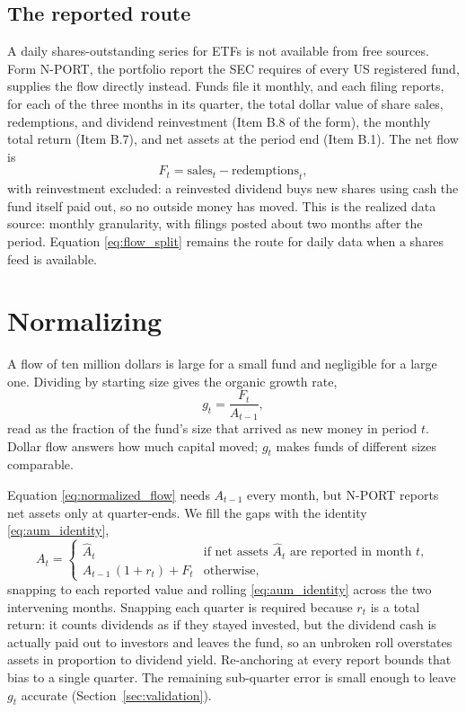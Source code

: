 \documentclass[11pt]{article}
\begin{document}
\subsection{The reported route}

A daily shares-outstanding series for ETFs is not available from free sources. Form
N-PORT, the portfolio report the SEC requires of every US registered fund, supplies the
flow directly instead. Funds file it monthly, and each filing reports, for each of the
three months in its quarter, the total dollar value of share sales, redemptions, and
dividend reinvestment (Item B.8 of the form), the monthly total return (Item B.7), and
net assets at the period end (Item B.1). The net flow is
\begin{equation}
\label{eq:flow_reported}
F_t = \text{sales}_t - \text{redemptions}_t,
\end{equation}
with reinvestment excluded: a reinvested dividend buys new shares using cash the fund
itself paid out, so no outside money has moved. This is the realized
data source: monthly granularity, with filings posted about two months after the period.
Equation \eqref{eq:flow_split} remains the route for daily data when a shares feed is
available.

\section{Normalizing}
\label{sec:normalizing}

A flow of ten million dollars is large for a small fund and negligible for a large one.
Dividing by starting size gives the organic growth rate,
\begin{equation}
\label{eq:normalized_flow}
g_t = \frac{F_t}{A_{t-1}},
\end{equation}
read as the fraction of the fund's size that arrived as new money in period $t$. Dollar
flow answers how much capital moved; $g_t$ makes funds of different sizes comparable.

Equation \eqref{eq:normalized_flow} needs $A_{t-1}$ every month, but N-PORT reports net
assets only at quarter-ends. We fill the gaps with the identity \eqref{eq:aum_identity},
\begin{equation}
\label{eq:aum_recursion}
A_t =
\begin{cases}
\widehat{A}_t & \text{if net assets } \widehat{A}_t \text{ are reported in month } t,\\[4pt]
A_{t-1}\,(1 + r_t) + F_t & \text{otherwise,}
\end{cases}
\end{equation}
snapping to each reported value and rolling \eqref{eq:aum_identity} across the two
intervening months. Snapping each quarter is required because $r_t$ is a total return:
it counts dividends as if they stayed invested, but the dividend cash is actually paid
out to investors and leaves the fund, so an unbroken roll overstates assets in
proportion to dividend yield. Re-anchoring at every report bounds that bias to
a single quarter. The remaining sub-quarter error is small enough to leave $g_t$ accurate
(Section~\ref{sec:validation}).
\end{document}
